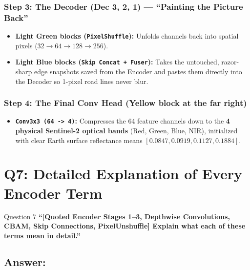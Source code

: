 \documentclass[11pt,a4paper]{article}
\begin{document}
\subsubsection*{Step 3: The Decoder (Dec 3, 2, 1) --- ``Painting the Picture Back''}
\begin{itemize}[leftmargin=1.5em]
    \item \textbf{Light Green blocks (\texttt{PixelShuffle}):} Unfolds channels back into spatial pixels ($32 \to 64 \to 128 \to 256$).
    \item \textbf{Light Blue blocks (\texttt{Skip Concat + Fuser}):} Takes the untouched, razor-sharp edge snapshots saved from the Encoder and pastes them directly into the Decoder so 1-pixel road lines never blur.
\end{itemize}

\subsubsection*{Step 4: The Final Conv Head (Yellow block at the far right)}
\begin{itemize}[leftmargin=1.5em]
    \item \textbf{\texttt{Conv3x3 (64 -> 4)}:} Compresses the 64 feature channels down to the \textbf{4 physical Sentinel-2 optical bands} (Red, Green, Blue, NIR), initialized with clear Earth surface reflectance means $[0.0847, 0.0919, 0.1127, 0.1884]$.
\end{itemize}

\bigskip

\section{Q7: Detailed Explanation of Every Encoder Term}

\begin{questionbox}{Question 7}
\textbf{``[Quoted Encoder Stages 1--3, Depthwise Convolutions, CBAM, Skip Connections, PixelUnshuffle] Explain what each of these terms mean in detail.''}
\end{questionbox}

\subsection*{Answer:}
\end{document}
